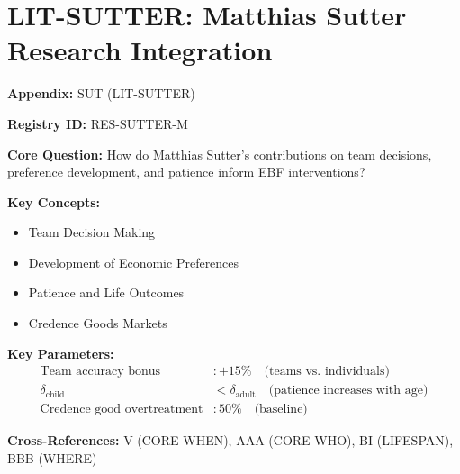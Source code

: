 \chapter{LIT-SUTTER: Matthias Sutter Research Integration}
\label{app:sut}


\begin{tcolorbox}[colback=blue!5!white, colframe=blue!75!black,
    title=Quick Reference: Appendix SUT]

\textbf{Appendix:} SUT (LIT-SUTTER)

\textbf{Registry ID:} RES-SUTTER-M

\textbf{Core Question:} How do Matthias Sutter's contributions on team decisions,
preference development, and patience inform EBF interventions?

\textbf{Key Concepts:}
\begin{itemize}[nosep]
\item Team Decision Making
\item Development of Economic Preferences
\item Patience and Life Outcomes
\item Credence Goods Markets
\end{itemize}

\textbf{Key Parameters:}
\begin{align}
\text{Team accuracy bonus} &: +15\% \quad \text{(teams vs. individuals)} \\
\delta_{\text{child}} &< \delta_{\text{adult}} \quad \text{(patience increases with age)} \\
\text{Credence good overtreatment} &: 50\% \quad \text{(baseline)}
\end{align}

\textbf{Cross-References:} V (CORE-WHEN), AAA (CORE-WHO), BI (LIFESPAN), BBB (WHERE)
\end{tcolorbox}


\begin{abstract}
This appendix documents the research contributions of Matthias Sutter
(h-index: 72, Director at Max Planck Institute) to experimental economics
and their integration into the Evidence-Based Framework (EBF). Sutter's work
is particularly valuable for understanding (1) how team contexts improve
decision quality, (2) how economic preferences develop across the lifespan,
and (3) how patience predicts long-term life outcomes. His research informs
EBF's treatment of $\Psi_{\text{social}}$ (team context) and developmental
heterogeneity in the WHO dimension.
\end{abstract}


